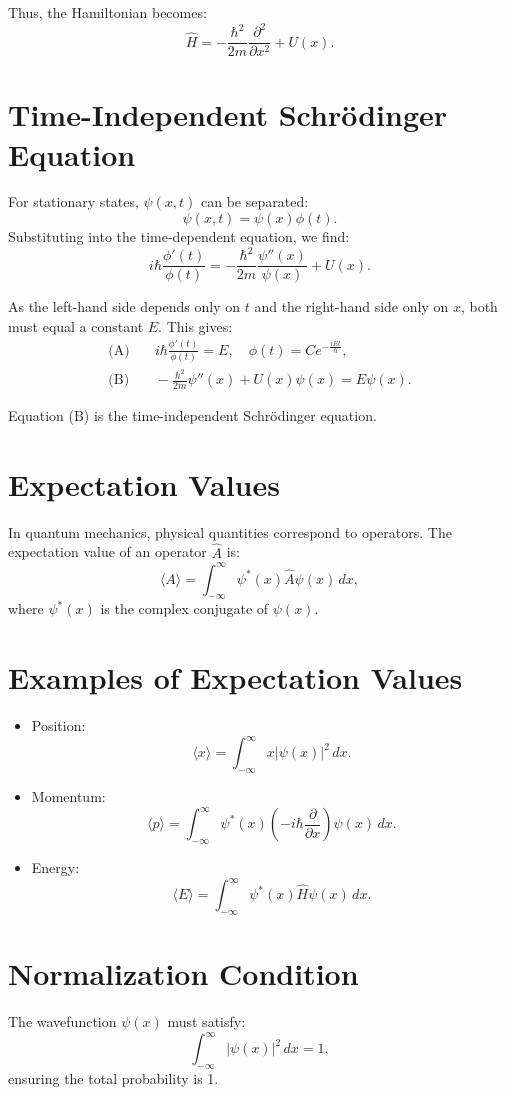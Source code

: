 \documentclass[a4paper,12pt]{article}
\begin{document}
\begin{multicols}{2}
Thus, the Hamiltonian becomes:
\[
\hat{H} = -\frac{\hbar^2}{2m} \frac{\partial^2}{\partial x^2} + U(x).
\]

\section*{Time-Independent Schrödinger Equation}
For stationary states, $\psi(x,t)$ can be separated:
\[
\psi(x,t) = \psi(x)\phi(t).
\]
Substituting into the time-dependent equation, we find:
\[
i\hbar \frac{\phi'(t)}{\phi(t)} = -\frac{\hbar^2}{2m} \frac{\psi''(x)}{\psi(x)} + U(x).
\]

As the left-hand side depends only on $t$ and the right-hand side only on $x$, both must equal a constant $E$. This gives:
\begin{align*}
\text{(A)} & \quad i\hbar \frac{\phi'(t)}{\phi(t)} = E, \quad \phi(t) = Ce^{-\frac{iEt}{\hbar}}, \\
\text{(B)} & \quad -\frac{\hbar^2}{2m} \psi''(x) + U(x)\psi(x) = E\psi(x).
\end{align*}

Equation (B) is the time-independent Schrödinger equation.

\section*{Expectation Values}
In quantum mechanics, physical quantities correspond to operators. The expectation value of an operator $\hat{A}$ is:
\[
\langle A \rangle = \int_{-\infty}^\infty \psi^*(x) \hat{A} \psi(x) \, dx,
\]
where $\psi^*(x)$ is the complex conjugate of $\psi(x)$.

\section*{Examples of Expectation Values}
\begin{itemize}
    \item Position:
    \[
    \langle x \rangle = \int_{-\infty}^\infty x |\psi(x)|^2 \, dx.
    \]
    \item Momentum:
    \[
    \langle p \rangle = \int_{-\infty}^\infty \psi^*(x) \left(-i\hbar \frac{\partial}{\partial x}\right) \psi(x) \, dx.
    \]
    \item Energy:
    \[
    \langle E \rangle = \int_{-\infty}^\infty \psi^*(x) \hat{H} \psi(x) \, dx.
    \]
\end{itemize}

\section*{Normalization Condition}
The wavefunction $\psi(x)$ must satisfy:
\[
\int_{-\infty}^\infty |\psi(x)|^2 \, dx = 1,
\]
ensuring the total probability is 1.


\end{multicols}
\end{document}
